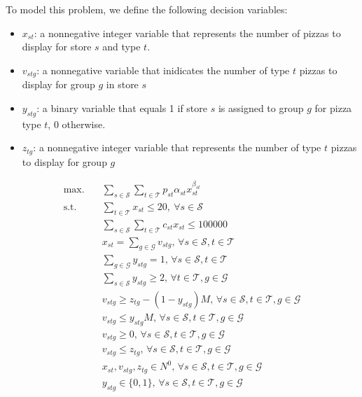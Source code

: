 \documentclass[a4, 11pt]{article}
\begin{document}
To model this problem, we define the following decision variables:

\begin{itemize}
	\item $x_{st}$: a nonnegative integer variable that represents the number of pizzas to display for store $s$ and type $t$.
	\item $v_{stg}$: a nonnegative variable that inidicates the number of type $t$ pizzas to display for group $g$ in store $s$
	\item $y_{stg}$: a binary variable that equals 1 if store $s$ is assigned to group $g$ for pizza type $t$, 0 otherwise.
	\item $z_{tg}$: a nonnegative integer variable that represents the number of type $t$ pizzas to display for group $g$
\end{itemize}

\begin{align}
	\text{max.} &\quad \sum_{s \in \mathcal{S}} \sum_{t \in \mathcal{T}} p_{st} \alpha_{st} x_{st}^{\beta_{st}} \label{m2-obj} \\
	\text{s.t.} &\quad  \sum_{t \in \mathcal{T}} x_{st} \leq 20, \ \forall s \in \mathcal{S} \label{m2-cons1} \\
	&\quad \sum_{s \in \mathcal{S}} \sum_{t \in \mathcal{T}} c_{st} x_{st} \leq 100000 \label{m2-cons2} \\
	&\quad x_{st} = \sum_{g \in \mathcal{G}} v_{stg}, \, \forall s \in \mathcal{S}, t \in \mathcal{T} \label{m2-cons3} \\
	&\quad \sum_{g \in \mathcal{G}} y_{stg} = 1, \, \forall s \in \mathcal{S}, t \in \mathcal{T} \label{m2-cons4} \\
	&\quad \sum_{s \in \mathcal{S}} y_{stg} \geq 2, \, \forall t \in \mathcal{T}, g \in \mathcal{G} \label{m2-cons5} \\
	&\quad v_{stg} \geq z_{tg} - (1 - y_{stg}) M, \, \forall s \in \mathcal{S}, t \in \mathcal{T}, g \in \mathcal{G} \label{m2-cons6} \\
	&\quad v_{stg} \leq y_{stg} M, \, \forall s \in \mathcal{S}, t \in \mathcal{T}, g \in \mathcal{G} \label{m2-cons7}  \\
	&\quad v_{stg} \geq 0, \, \forall s \in \mathcal{S}, t \in \mathcal{T}, g \in \mathcal{G} \label{m2-cons8} \\
	&\quad v_{stg} \leq z_{tg}, \, \forall s \in \mathcal{S}, t \in \mathcal{T}, g \in \mathcal{G} \label{m2-cons9} \\
	&\quad x_{st}, v_{stg}, z_{tg} \in N^0, \, \forall s \in \mathcal{S}, t \in \mathcal{T}, g \in \mathcal{G} \label{m2-cons10} \\
	&\quad y_{stg} \in \{0, 1\}, \, \forall s \in \mathcal{S}, t \in \mathcal{T}, g \in \mathcal{G} \label{m2-cons11}
\end{align}


	
\end{document}
